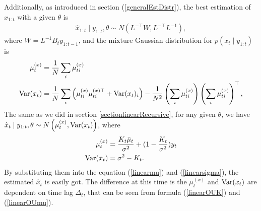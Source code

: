 Additionally, as introduced in section (\ref{generalEstDistr}), the best estimation of $x_{1:t}$ with a given $\theta$ is 
\begin{align*}
\hat{x}_{1:t} \mid y_{1:t},\theta \sim N(L^{-\top}W,L^{-\top}L^{-1}),
\end{align*}
where $W = L^{-1}B_{t}y_{1:t-1}$, and the mixture Gaussian distribution for $p(x_t \mid y_{1:t})$ is 
\begin{align}
\mu_t^{(x)} &= \frac{1}{N} \sum_i \mu_{ti}^{(x)}  \\
\mathrm{Var}(x_t) &= \frac{1}{N} \sum_i \left( \mu_{ti}^{(x)}  \mu_{ti}^{(x)\top} +\mathrm{Var}(x_t)_i\right) -\frac{1}{N^2} \left(  \sum_i  \mu_{ti}^{(x)} \right) \left( \sum_i \mu_{ti}^{(x)} \right) ^\top,
\end{align}
The same as we did in section \ref{sectionlinearRecursive}, for any given $\theta$, we have $\hat{x}_{t}\mid y_{1:t},\theta \sim N\left( \mu_{t}^{(x)},\mathrm{Var}(x_t) \right)$, where
\begin{align*}
\mu_{t}^{(x)} &  =  \frac{K_{t}\bar{\mu}_{t}}{\sigma^2}+(1-\frac{K_{t}}{\sigma^2})y_{t} \\
\mathrm{Var}(x_t)&= \sigma^2-K_{t}.
\end{align*}
By substituting them into the equation (\ref{linearmu}) and (\ref{linearsigma}), the estimated $\hat{x}_t$ is easily got. The difference at this time is the $\mu_{t}^{(x)}$ and $\mathrm{Var}(x_t)$ are dependent on time lag $\Delta_t$, that can be seen from formula (\ref{linearOUK}) and (\ref{linearOUmu}). 



